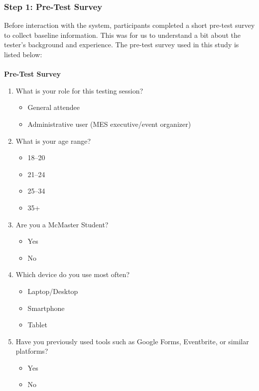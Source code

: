 \documentclass[12pt]{article}
\begin{document}
\subsubsection{Step 1: Pre-Test Survey}
Before interaction with the system, participants completed a short pre-test survey to collect baseline information. This was for us to understand a bit about the tester's background and experience. The pre-test survey used in this study is listed below: \\
\\
\textbf{Pre-Test Survey}
\begin{enumerate}
    \item What is your role for this testing session?
    \begin{itemize}[label=$\circ$]
        \item General attendee
        \item Administrative user (MES executive/event organizer)
    \end{itemize}
    \item What is your age range?
    \begin{itemize}[label=$\circ$]
        \item 18--20
        \item 21--24
        \item 25--34
        \item 35+
    \end{itemize}
     \item Are you a McMaster Student?
    \begin{itemize}[label=$\circ$]
        \item Yes
        \item No
    \end{itemize}
    \item Which device do you use most often?
    \begin{itemize}[label=$\circ$]
        \item Laptop/Desktop
        \item Smartphone
        \item Tablet
    \end{itemize}
    \item Have you previously used tools such as Google Forms, Eventbrite, or similar platforms?
    \begin{itemize}[label=$\circ$]
        \item Yes
        \item No
    \end{itemize}

\end{enumerate}
\end{document}
